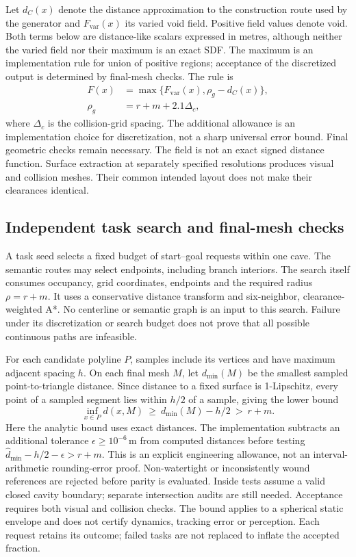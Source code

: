 Let $d_C(x)$ denote the distance approximation to the construction route used
by the generator and $F_{\mathrm{var}}(x)$ its varied void field. Positive field
values denote void. Both terms below are distance-like scalars expressed in
metres, although neither the varied field nor their maximum is an exact SDF.
The maximum is an implementation rule for union of positive regions; acceptance
of the discretized output is determined by final-mesh checks. The rule is
\begin{equation}
\begin{aligned}
F(x)&=\max\{F_{\mathrm{var}}(x),\rho_g-d_C(x)\},\\
\rho_g&=r+m+2.1\Delta_c,
\end{aligned}
\end{equation}
where $\Delta_c$ is the collision-grid spacing. The additional allowance is an
implementation choice for discretization, not a sharp universal error bound.
Final geometric checks remain necessary. The field is not an exact signed
distance function. Surface extraction at separately specified resolutions
produces visual and collision meshes. Their common intended layout does not
make their clearances identical.

\subsection{Independent task search and final-mesh checks}
A task seed selects a fixed budget of start--goal requests within one cave.
The semantic routes may select endpoints, including branch interiors.
The search itself consumes occupancy, grid coordinates, endpoints and the
required radius $\rho=r+m$. It uses a conservative distance transform and
six-neighbor, clearance-weighted A*. No centerline or semantic graph is an
input to this search. Failure under its discretization or search budget does
not prove that all possible continuous paths are infeasible.

For each candidate polyline $P$, samples include its vertices and have maximum
adjacent spacing $h$. On each final mesh $M$, let $d_{\min}(M)$ be the smallest
sampled point-to-triangle distance. Since distance to a fixed surface is
1-Lipschitz, every point of a sampled segment lies within $h/2$ of a sample,
giving the lower bound
\begin{equation}
\inf_{x\in P}d(x,M)\ \geq\ d_{\min}(M)-h/2\ >\ r+m.
\label{eq:clearance}
\end{equation}
Here the analytic bound uses exact distances. The implementation subtracts
an additional tolerance $\epsilon\geq10^{-6}$\,m from computed distances before
testing $\widehat d_{\min}-h/2-\epsilon>r+m$. This is an explicit engineering
allowance, not an interval-arithmetic rounding-error proof. Non-watertight or
inconsistently wound references are rejected before parity is evaluated.
Inside tests assume a valid closed cavity boundary; separate intersection
audits are still needed. Acceptance
requires both visual and collision checks. The bound applies to a spherical
static envelope and does not certify dynamics, tracking error or perception.
Each request retains its outcome; failed tasks are not replaced to inflate
the accepted fraction.

